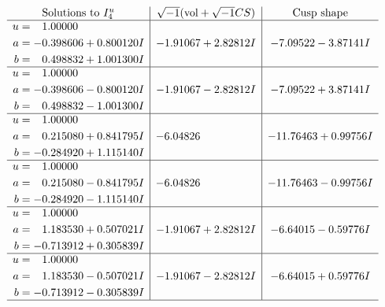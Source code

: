 \documentclass[1p]{elsarticle_modified}
\theoremstyle{definition}
\newcommand{\I}{\sqrt{-1}}
\begin{document}
$$\begin{array}{c|c|c}  
\text{Solutions to }I^u_{4}& \I (\text{vol} + \sqrt{-1}CS) & \text{Cusp shape}\\
 \hline 
\begin{aligned}
u &= \phantom{-}1.00000\phantom{ +0.000000I} \\
a &= -0.398606 + 0.800120 I \\
b &= \phantom{-}0.498832 + 1.001300 I\end{aligned}
 & -1.91067 + 2.82812 I & -7.09522 - 3.87141 I \\ \hline\begin{aligned}
u &= \phantom{-}1.00000\phantom{ +0.000000I} \\
a &= -0.398606 - 0.800120 I \\
b &= \phantom{-}0.498832 - 1.001300 I\end{aligned}
 & -1.91067 - 2.82812 I & -7.09522 + 3.87141 I \\ \hline\begin{aligned}
u &= \phantom{-}1.00000\phantom{ +0.000000I} \\
a &= \phantom{-}0.215080 + 0.841795 I \\
b &= -0.284920 + 1.115140 I\end{aligned}
 & -6.04826\phantom{ +0.000000I} & -11.76463 + 0.99756 I \\ \hline\begin{aligned}
u &= \phantom{-}1.00000\phantom{ +0.000000I} \\
a &= \phantom{-}0.215080 - 0.841795 I \\
b &= -0.284920 - 1.115140 I\end{aligned}
 & -6.04826\phantom{ +0.000000I} & -11.76463 - 0.99756 I \\ \hline\begin{aligned}
u &= \phantom{-}1.00000\phantom{ +0.000000I} \\
a &= \phantom{-}1.183530 + 0.507021 I \\
b &= -0.713912 + 0.305839 I\end{aligned}
 & -1.91067 + 2.82812 I & -6.64015 - 0.59776 I \\ \hline\begin{aligned}
u &= \phantom{-}1.00000\phantom{ +0.000000I} \\
a &= \phantom{-}1.183530 - 0.507021 I \\
b &= -0.713912 - 0.305839 I\end{aligned}
 & -1.91067 - 2.82812 I & -6.64015 + 0.59776 I\\
 \hline 
 \end{array}$$\newpage
\end{document}
